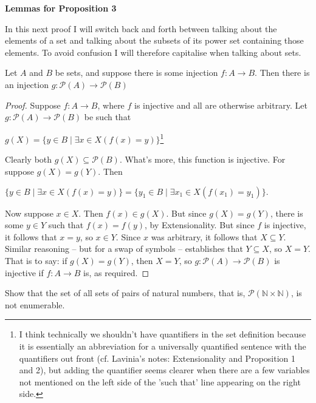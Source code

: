 \documentclass{article}
\begin{document}
\begin{center} \textbf{Lemmas for Proposition 3} \end{center} In this next proof I will switch back and forth between talking about the elements of a set and talking about the subsets of its power set containing those elements. To avoid confusion I will therefore capitalise when talking about sets. \begin{lemma} Let $A$ and $B$ be sets, and suppose there is some injection $f: A \rightarrow B$. Then there is an injection $g: \mathscr{P}(A) \rightarrow \mathscr{P}(B)$ \end{lemma}
\begin{proof} Suppose $f: A \rightarrow B$, where $f$ is injective and all are otherwise arbitrary. Let $g: \mathscr{P}(A) \rightarrow \mathscr{P}(B)$ be such that \begin{center} $g(X) = \{y \in B \mid \exists x \in X(f(x) = y)\}$\footnote[5]{I think technically we shouldn't have quantifiers in the set definition because it is essentially an abbreviation for a universally quantified sentence with the quantifiers out front (cf. Lavinia's notes: Extensionality and Proposition 1 and 2), but adding the quantifier seems clearer when there are a few variables not mentioned on the left side of the 'such that' line appearing on the right side.} \end{center} Clearly both $g(X) \subseteq \mathscr{P}(B)$. What's more, this function is injective. For suppose $g(X) = g(Y)$. Then \begin{center} $\{y \in B \mid \exists x \in X(f(x) = y)\} = \{y_1 \in B \mid \exists x_1 \in X(f(x_1) = y_1)\}.$ \end{center} Now suppose $x \in X$. Then $f(x) \in g(X)$. But since $g(X) = g(Y)$, there is some $y \in Y$ such that $f(x) = f(y)$, by Extensionality. But since $f$ is injective, it follows that $x = y$, so $x \in Y$. Since $x$ was arbitrary, it follows that $X \subseteq Y$. Similar reasoning – but for a swap of symbols – establishes that $Y \subseteq X$, so $X = Y$. That is to say: if $g(X) = g(Y)$, then $X =Y$, so $g: \mathscr{P}(A) \rightarrow \mathscr{P}(B)$ is injective if $f: A \rightarrow B$ is, as required. 
 \end{proof} 
\begin{proposition}
 Show that the set of all sets of pairs of natural numbers, that is, $\mathscr{P}(\mathbb{N} \times \mathbb{N})$, is not enumerable. 
 \end{proposition}
\end{document}
